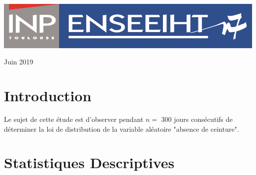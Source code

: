 \documentclass[a4paper,oneside]{article}
\begin{document}
\begin{titlepage}
	\vfill %


	\includegraphics[scale=0.8]{logoN7.png} %

	\vspace{0.3\baselineskip} %

Juin 2019 %
\end{titlepage}
\newpage


\section{Introduction}

Le sujet de cette étude est d'observer pendant $n =$ 300 jours consécutifs de déterminer la loi de distribution de la variable aléatoire "absence de ceinture".
\section{Statistiques Descriptives}
\end{document}
